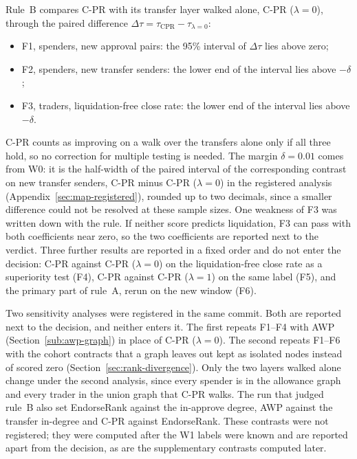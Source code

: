 Rule~B compares C-PR with its transfer layer walked alone, C-PR ($\lambda=0$), through the paired difference $\Delta\tau=\tau_{\mathrm{CPR}}-\tau_{\lambda=0}$:
\begin{itemize}
\item F1, spenders, new approval pairs: the 95\% interval of $\Delta\tau$ lies above zero;
\item F2, spenders, new transfer senders: the lower end of the interval lies above $-\delta$;
\item F3, traders, liquidation-free close rate: the lower end of the interval lies above $-\delta$.
\end{itemize}
C-PR counts as improving on a walk over the transfers alone only if all three hold, so no correction for multiple testing is needed. The margin $\delta=0.01$ comes from W0: it is the half-width of the paired interval of the corresponding contrast on new transfer senders, C-PR minus C-PR ($\lambda=0$) in the registered analysis (Appendix~\ref{sec:map-registered}), rounded up to two decimals, since a smaller difference could not be resolved at these sample sizes. One weakness of F3 was written down with the rule. If neither score predicts liquidation, F3 can pass with both coefficients near zero, so the two coefficients are reported next to the verdict. Three further results are reported in a fixed order and do not enter the decision: C-PR against C-PR ($\lambda=0$) on the liquidation-free close rate as a superiority test (F4), C-PR against C-PR ($\lambda=1$) on the same label (F5), and the primary part of rule~A, rerun on the new window (F6).

Two sensitivity analyses were registered in the same commit. Both are reported next to the decision, and neither enters it. The first repeats F1--F4 with AWP (Section~\ref{sub:awp-graph}) in place of C-PR ($\lambda=0$). The second repeats F1--F6 with the cohort contracts that a graph leaves out kept as isolated nodes instead of scored zero (Section~\ref{sec:rank-divergence}). Only the two layers walked alone change under the second analysis, since every spender is in the allowance graph and every trader in the union graph that C-PR walks. The run that judged rule~B also set EndorseRank against the in-approve degree, AWP against the transfer in-degree and C-PR against EndorseRank. These contrasts were not registered; they were computed after the W1 labels were known and are reported apart from the decision, as are the supplementary contrasts computed later.


